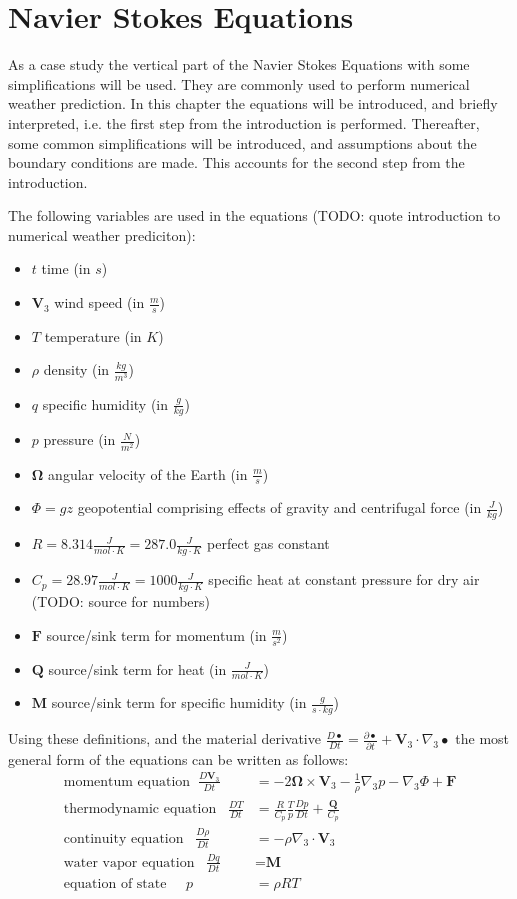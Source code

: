 \chapter{Navier Stokes Equations}\label{chapter:navier_stokes}
As a case study the vertical part of the Navier Stokes Equations with some simplifications will be used.
They are commonly used to perform numerical weather prediction.
In this chapter the equations will be introduced, and briefly interpreted, i.e. the first step from the introduction is performed.
Thereafter, some common simplifications will be introduced, and assumptions about the boundary conditions are made.
This accounts for the second step from the introduction.

The following variables are used in the equations (TODO: quote introduction to numerical weather prediciton):
\begin{itemize}
\item $t$ time (in $s$)
\item $\textbf{V}_3$ wind speed (in $\frac{m}{s}$)
\item $T$ temperature (in $K$)
\item $\rho$ density (in $\frac{kg}{m^3}$)
\item $q$ specific humidity (in $\frac{g}{kg}$)
\item $p$ pressure (in $\frac{N}{m^2}$)
\item $\boldsymbol{\Omega}$ angular velocity of the Earth (in $\frac{m}{s}$)
\item $\Phi = gz$ geopotential comprising effects of gravity and centrifugal force (in $\frac{J}{kg}$)
\item $R=8.314\frac{J}{mol\cdot K} = 287.0 \frac{J}{kg\cdot K}$ perfect gas constant
\item $C_p=28.97 \frac{J}{mol\cdot K} = 1000 \frac{J}{kg\cdot K}$ specific heat at constant pressure for dry air (TODO: source for numbers)
\item $\textbf{F}$ source/sink term for momentum (in $\frac{m}{s^2}$)
\item $\textbf{Q}$ source/sink term for heat (in $\frac{J}{mol\cdot K}$)
\item $\textbf{M}$ source/sink term for specific humidity (in $\frac{g}{s\cdot kg}$)
\end{itemize}
Using these definitions, and the material derivative $\frac{D\bullet}{Dt}=\frac{\partial\bullet}{\partial t}+\textbf{V}_3\cdot \nabla_3\bullet$ the most general form of the equations can be written as follows:
\begin{align}
\text{momentum equation}\;\; \frac{D\textbf{V}_3}{Dt} &= -2\boldsymbol{\Omega}\times \textbf{V}_3 - \frac{1}{\rho}\nabla _3 p - \nabla _3 \Phi + \textbf{F} \label{eq_mom}\\
\text{thermodynamic equation}\;\;\; \frac{DT}{Dt} &= \frac{R}{C_p}\frac{T}{p}\frac{Dp}{Dt}+\frac{\textbf{Q}}{C_p}\label{eq_therm}\\
\text{continuity equation}\;\;\; \frac{D\rho}{Dt} &= -\rho \nabla _3 \cdot \textbf{V}_3\label{eq_cont}\\
\text{water vapor equation}\;\;\; \frac{Dq}{Dt} &= \textbf{M}\label{eq_water}\\
\text{equation of state}\;\;\;\;\; p &= \rho R T \label{eq_state}
\end{align}
